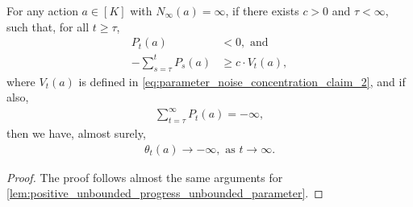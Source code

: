\begin{lemma}
\label{lem:negative_unbounded_progress_unbounded_parameter}
For any action $a \in [K]$ with $N_\infty(a) = \infty$, if there exists $c > 0$ and $\tau < \infty$, such that, for all $t \ge \tau$,
\begin{align}
\label{eq:negative_unbounded_progress_unbounded_parameter_claim_1a}
    P_t(a) &< 0, \text{ and} \\
\label{eq:negative_unbounded_progress_unbounded_parameter_claim_1b}
    - \sum_{s=\tau}^{t} P_s(a) &\ge c \cdot V_t(a),
\end{align}
where $V_t(a)$ is defined in \cref{eq:parameter_noise_concentration_claim_2}, and if also,
\begin{align}
\label{eq:negative_unbounded_progress_unbounded_parameter_claim_2}
    \sum_{t=\tau}^{\infty}{ P_t(a) } = - \infty,
\end{align}
then we have, almost surely,
\begin{align}
\label{eq:negative_unbounded_progress_unbounded_parameter_claim_3}
    \theta_t(a) \to - \infty, \text{ as } t \to \infty.
\end{align}
\end{lemma}
\begin{proof}
The proof follows almost the same arguments for \cref{lem:positive_unbounded_progress_unbounded_parameter}.
\end{proof}


